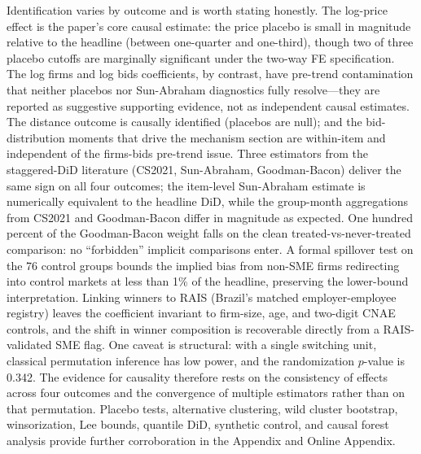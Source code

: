Identification varies by outcome and is worth stating honestly. The log-price effect is the paper's core causal estimate: the price placebo is small in magnitude relative to the headline (between one-quarter and one-third), though two of three placebo cutoffs are marginally significant under the two-way FE specification. The log firms and log bids coefficients, by contrast, have pre-trend contamination that neither placebos nor Sun-Abraham diagnostics fully resolve---they are reported as suggestive supporting evidence, not as independent causal estimates. The distance outcome is causally identified (placebos are null); and the bid-distribution moments that drive the mechanism section are within-item and independent of the firms-bids pre-trend issue. Three estimators from the staggered-DiD literature (CS2021, Sun-Abraham, Goodman-Bacon) deliver the same sign on all four outcomes; the item-level Sun-Abraham estimate is numerically equivalent to the headline DiD, while the group-month aggregations from CS2021 and Goodman-Bacon differ in magnitude as expected. One hundred percent of the Goodman-Bacon weight falls on the clean treated-vs-never-treated comparison: no ``forbidden'' implicit comparisons enter. A formal spillover test on the 76 control groups bounds the implied bias from non-SME firms redirecting into control markets at less than 1\% of the headline, preserving the lower-bound interpretation. Linking winners to RAIS (Brazil's matched employer-employee registry) leaves the coefficient invariant to firm-size, age, and two-digit CNAE controls, and the shift in winner composition is recoverable directly from a RAIS-validated SME flag. One caveat is structural: with a single switching unit, classical permutation inference has low power, and the randomization $p$-value is 0.342. The evidence for causality therefore rests on the consistency of effects across four outcomes and the convergence of multiple estimators rather than on that permutation. Placebo tests, alternative clustering, wild cluster bootstrap, winsorization, Lee bounds, quantile DiD, synthetic control, and causal forest analysis provide further corroboration in the Appendix and Online Appendix.

